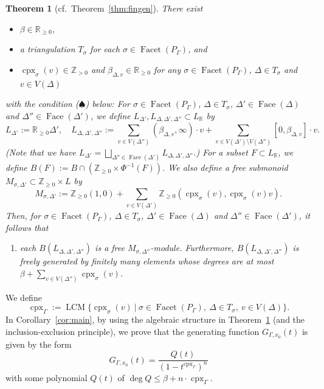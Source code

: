 \documentclass[11pt]{article}
\newtheorem{thm}[theo]{Theorem}
\theoremstyle{definition}
\numberwithin{equation}{section}
\begin{document}
\begin{thm}[{cf.\ Theorem~\ref{thm:fingen}}]\label{thm:intro}
There exist 
\begin{itemize}
\item $\beta \in \mathbb{R}_{\ge 0}$, 
\item a triangulation $T_{\sigma}$ for each $\sigma \in \operatorname{Facet}(P_{\Gamma})$, and 
\item $\operatorname{cpx}_{\sigma} (v) \in \mathbb{Z}_{>0}$ and $\beta _{\Delta , v} \in \mathbb{R}_{\ge 0}$ for any $\sigma \in \operatorname{Facet}(P_{\Gamma})$, $\Delta \in T_{\sigma}$ and $v \in V(\Delta)$
\end{itemize}
with the condition ($\spadesuit$) below: 
For $\sigma \in \operatorname{Facet}(P_{\Gamma})$, $\Delta \in T_{\sigma}$, $\Delta' \in \operatorname{Face}(\Delta)$ and $\Delta'' \in \operatorname{Face}(\Delta')$, we define $L_{\Delta'}, L_{\Delta, \Delta', \Delta''} \subset L_{\mathbb{R}}$ by
\[
L_{\Delta'} := \mathbb{R}_{\ge 0} \Delta', \quad 
L_{\Delta, \Delta', \Delta''} := 
\sum_{v \in V(\Delta'')} (\beta _{\Delta , v}, \infty) \cdot v + 
\sum_{v \in V(\Delta') \setminus V(\Delta'')} [0,\beta _{\Delta , v}] \cdot v. 
\]
(Note that we have $L_{\Delta'} 
= 
\bigsqcup\limits_{\Delta'' \in \operatorname{Face}(\Delta')} 
L_{\Delta, \Delta', \Delta''}$.)
For a subset $F \subset L_{\mathbb{R}}$, we define $B \left( F \right) := B \cap \left( \mathbb{Z}_{\ge 0} \times \Phi^{-1} \left( F \right) \right)$. 
We also define a free submonoid $M_{\sigma , \Delta'} \subset \mathbb{Z}_{\ge 0} \times L$ by 
\[
M_{\sigma , \Delta'} := 
\mathbb{Z}_{\ge 0}(1,0) + 
\sum _{v \in V(\Delta')} \mathbb{Z}_{\ge 0} \left( \operatorname{cpx}_{\sigma} (v), \operatorname{cpx}_{\sigma} (v) v \right). 
\]
Then, for $\sigma \in \operatorname{Facet}(P_{\Gamma})$, $\Delta \in T_{\sigma}$, $\Delta' \in \operatorname{Face}(\Delta)$ and $\Delta'' \in \operatorname{Face}(\Delta')$, it follows that 
\begin{enumerate}
\item[($\spadesuit$)]
each $B \left( L_{\Delta, \Delta', \Delta''} \right)$ is a free $M_{\sigma , \Delta''}$-module. Furthermore, $B \left( L_{\Delta, \Delta', \Delta''} \right)$ is freely generated by finitely many elements whose degrees are at most $\beta + \sum _{v \in V(\Delta'')} \operatorname{cpx}_{\sigma} (v)$. 
\end{enumerate}
\end{thm}
\noindent
We define 
\[
\operatorname{cpx}_{\Gamma} :=
\operatorname{LCM} \bigl\{ \operatorname{cpx}_{\sigma}(v) \ \big | \ \sigma \in \operatorname{Facet}(P _{\Gamma}),\ \Delta \in T_{\sigma},\ v \in V(\Delta) \bigr \}.
\]
In Corollary~\ref{cor:main}, by using the algebraic structure in Theorem~\ref{thm:intro} (and the inclusion-exclusion principle), we prove that the generating function $G_{\Gamma, x_0}(t)$ is given by the form
\[
G_{\Gamma, x_0}(t) = \frac{Q(t)}{(1-t^{\operatorname{cpx}_{\Gamma}}) ^n}
\]
with some polynomial $Q(t)$ of $\deg Q \le \beta + n \cdot \operatorname{cpx}_{\Gamma}$. 
\end{document}
